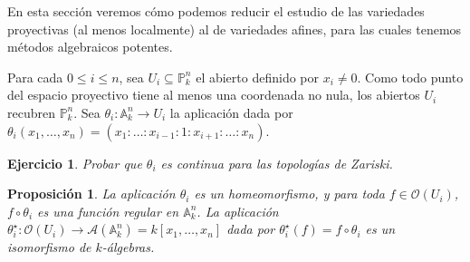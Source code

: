 \documentclass[a4paper,10pt]{book}
\newtheorem{prop}[thm]{Proposición}
\newtheorem{ejercicio}{Ejercicio}[chapter]
\newcommand{\AAA}{\mathbb A}
\newcommand{\PP}{\mathbb P}
\newcommand{\Ank}{\AAA^n_k}
\newcommand{\Pnk}{\PP^n_k}
\newcommand{\calA}{{\mathcal A}}
\newcommand{\OO}{{\mathcal O}}
\begin{document}
En esta sección veremos cómo podemos reducir el estudio de las variedades proyectivas (al menos localmente) al de variedades afines, para las cuales tenemos métodos algebraicos potentes.

Para cada $0\leq i\leq n$, sea $U_i\subseteq\Pnk$ el abierto definido por $x_i\neq 0$. Como todo punto del espacio proyectivo tiene al menos una coordenada no nula, los abiertos $U_i$ recubren $\Pnk$. Sea $\theta_i:\Ank\to U_i$ la aplicación dada por $\theta_i(x_1,\ldots,x_n)=(x_1:\ldots:x_{i-1}:1:x_{i+1}:\ldots:x_n)$.

\begin{ejercicio}
 Probar que $\theta_i$ es continua para las topologías de Zariski.
\end{ejercicio}


\begin{prop}
 La aplicación $\theta_i$ es un homeomorfismo, y para toda $f\in\OO(U_i)$, $f\circ\theta_i$ es una función regular en $\Ank$. La aplicación $\theta_i^\star:\OO(U_i)\to\calA(\Ank)=k[x_1,\ldots,x_n]$ dada por $\theta_i^\star(f)=f\circ\theta_i$ es un isomorfismo de $k$-álgebras.
\end{prop}
\end{document}
